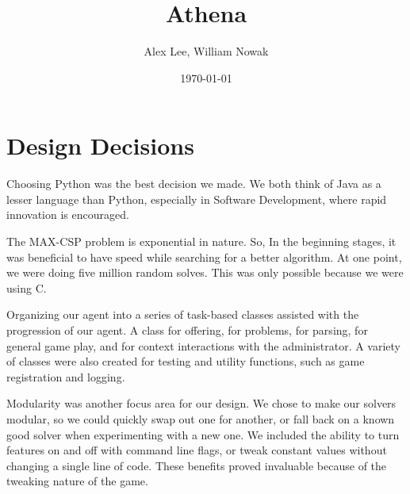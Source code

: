 \documentclass[letterpaper,12pt,oneside]{article}
\title{Athena}
\author{Alex Lee, William Nowak}
\date{\today}
\begin{document}
\maketitle



\section{Design Decisions}

Choosing Python was the best decision we made. We both think of Java as a
lesser language than Python, especially in Software Development,
where rapid innovation is encouraged.

The MAX-CSP problem is exponential in nature. So, In the beginning
stages, it was beneficial to have speed while searching for a better
algorithm. At one point, we were doing five million random solves. This
was only possible because we were using C.

Organizing our agent into a series of task-based classes assisted with the
progression of our agent. A class for offering, for problems, for parsing,
for general game play, and for context interactions with the administrator.
A variety of classes were also created for testing and utility functions, such
as game registration and logging.

Modularity was another focus area for our design. We chose to make our solvers
modular, so we could quickly swap out one for another, or fall back on a known
good solver when experimenting with a new one. We included the ability to turn
features on and off with command line flags, or tweak constant values without
changing a single line of code. These benefits proved invaluable because of the
tweaking nature of the game.

\end{document}
